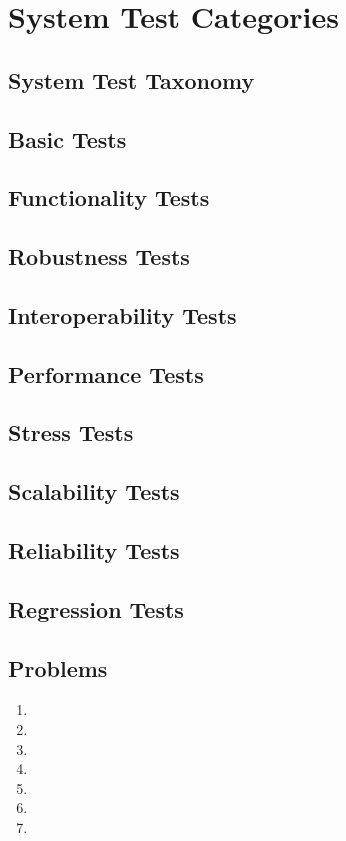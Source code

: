 \chapter{System Test Categories}
\section{System Test Taxonomy}
\section{Basic Tests}
\section{Functionality Tests}
\section{Robustness Tests}
\section{Interoperability Tests}
\section{Performance Tests}
\section{Stress Tests}
\section{Scalability Tests}
\section{Reliability Tests}
\section{Regression Tests}
\section{Problems}
\begin{enumerate}
    \item 
    \item 
    \item 
    \item 
    \item 
    \item
    \item 
\end{enumerate}